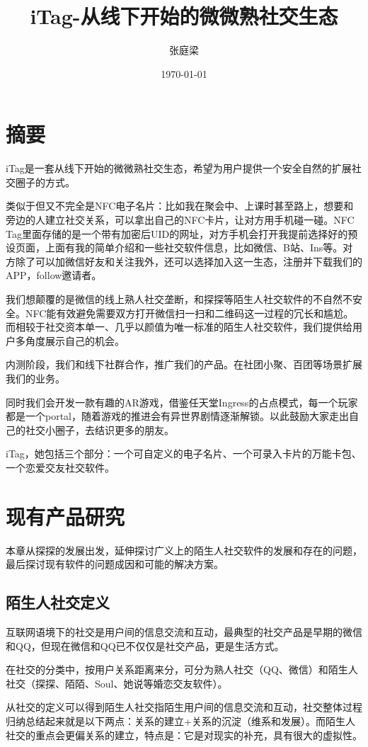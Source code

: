 \documentclass[UTF8]{ctexart}
\title{iTag-从线下开始的微微熟社交生态}
\author{张庭梁}
\date{\today}
\begin{document}
\maketitle

\section{摘要}

iTag是一套从线下开始的微微熟社交生态，希望为用户提供一个安全自然的扩展社交圈子的方式。

类似于但又不完全是NFC电子名片：比如我在聚会中、上课时甚至路上，想要和旁边的人建立社交关系，可以拿出自己的NFC卡片，让对方用手机碰一碰。NFC Tag里面存储的是一个带有加密后UID的网址，对方手机会打开我提前选择好的预设页面，上面有我的简单介绍和一些社交软件信息，比如微信、B站、Ins等。对方除了可以加微信好友和关注我外，还可以选择加入这一生态，注册并下载我们的APP，follow邀请者。

我们想颠覆的是微信的线上熟人社交垄断，和探探等陌生人社交软件的不自然不安全。NFC能有效避免需要双方打开微信扫一扫和二维码这一过程的冗长和尴尬。而相较于社交资本单一、几乎以颜值为唯一标准的陌生人社交软件，我们提供给用户多角度展示自己的机会。

内测阶段，我们和线下社群合作，推广我们的产品。在社团小聚、百团等场景扩展我们的业务。

同时我们会开发一款有趣的AR游戏，借鉴任天堂Ingress的占点模式，每一个玩家都是一个portal，随着游戏的推进会有异世界剧情逐渐解锁。以此鼓励大家走出自己的社交小圈子，去结识更多的朋友。

iTag，她包括三个部分：一个可自定义的电子名片、一个可录入卡片的万能卡包、一个恋爱交友社交软件。

\section{现有产品研究}
本章从探探的发展出发，延伸探讨广义上的陌生人社交软件的发展和存在的问题，最后探讨现有软件的问题成因和可能的解决方案。

\subsection{陌生人社交定义}

\begin{tcolorbox}
    互联网语境下的社交是用户间的信息交流和互动，最典型的社交产品是早期的微信和QQ，但现在微信和QQ已不仅仅是社交产品，更是生活方式。

    在社交的分类中，按用户关系距离来分，可分为熟人社交（QQ、微信）和陌生人社交（探探、陌陌、Soul、她说等婚恋交友软件）。

    从社交的定义可以得到陌生人社交指陌生用户间的信息交流和互动，社交整体过程归纳总结起来就是以下两点：关系的建立+关系的沉淀（维系和发展）。而陌生人社交的重点会更偏关系的建立，特点是：它是对现实的补充，具有很大的虚拟性。\cite{StrangerDefine}
\end{tcolorbox}
\end{document}
